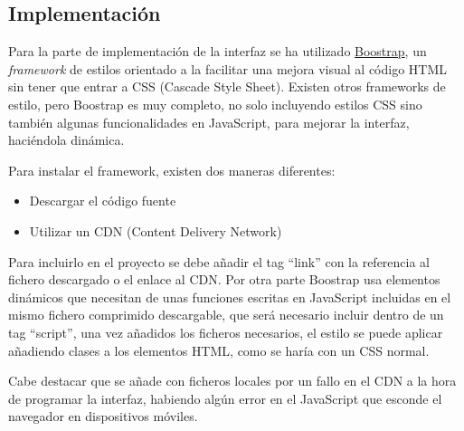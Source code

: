 \subsection{Implementación}
Para la parte de implementación de la interfaz se ha utilizado \href{https://getbootstrap.com/}{Boostrap}, un \emph{\gls{framework}} de estilos orientado a la facilitar una mejora visual al código \gls{HTML} sin tener que entrar a \gls{CSS} (Cascade Style Sheet). Existen otros \gls{frameworks} de estilo, pero Boostrap es muy completo, no solo incluyendo estilos \gls{CSS} sino también algunas funcionalidades en JavaScript, para mejorar la interfaz, haciéndola dinámica.

Para instalar el \gls{framework}, existen dos maneras diferentes:
\begin{itemize}
    \item Descargar el código fuente
    \item Utilizar un \gls{CDN} (Content Delivery Network)
\end{itemize}

Para incluirlo en el proyecto se debe añadir el \gls{tag} ``link'' con la referencia al fichero descargado o el enlace al \gls{CDN}. Por otra parte Boostrap usa elementos dinámicos que necesitan de unas funciones escritas en JavaScript incluidas en el mismo fichero comprimido descargable, que será necesario incluir dentro de un \gls{tag} ``script'', una vez añadidos los ficheros necesarios, el estilo se puede aplicar añadiendo clases a los elementos \gls{HTML}, como se haría con un \gls{CSS} normal.

Cabe destacar que se añade con ficheros locales por un fallo en el \gls{CDN} a la hora de programar la interfaz, habiendo algún error en el JavaScript que esconde el navegador en dispositivos móviles.

